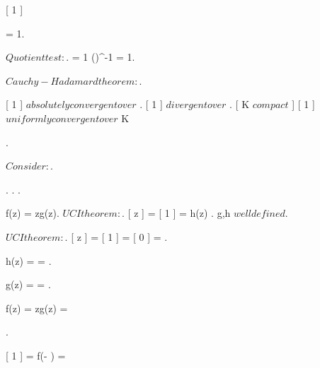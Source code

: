 \documentclass[../Main/main]{subfiles}
\begin{document}
{
	{
		\study
		{
			[ 1 ]
		}
		\start
		{
			{
				 = 1.

				$Quotient test:$.
				 = 1 \imp \left(\right)^{-1} = 1. 

				$Cauchy-Hadamard theorem:$.

				[ 1 ] $ absolutely convergent over $ \D.
				[ 1 ] $ divergent  over $ \C \setminus \closed{\D}.
				[ K $ compact $ ]
				{
					[ 1 ] $ uniformly convergent over $  K
				}
				
			}.


			{
				$Consider:$.

				.
				.
				.

				{
					f(z) = zg(z).
					$UCI theorem:$.
					[ z ] = [ 1 ] = h(z)
				}.
				g,h $ well defined $.

				{
					$UCI theorem:$.
					[ z ] =  [ 1 ] = [ 0 ] = .
					
					h(z) =  = .

					g(z) =  = .

					f(z) = zg(z) = 
				}

				
			}.


			{
				[ 1 ] = f(- ) = 
			}
		}
	}
	
}
\end{document}
